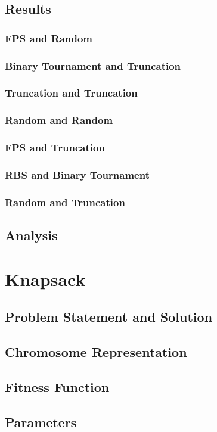 \documentclass[11pt, letterpaper]{article}
\begin{document}
\subsection{Results} 
\subsubsection {FPS and Random}
\subsubsection {Binary Tournament and Truncation}
\subsubsection {Truncation and Truncation}
\subsubsection {Random and Random}
\subsubsection {FPS and Truncation}
\subsubsection {RBS and Binary Tournament}
\subsubsection {Random and Truncation}
\subsection{Analysis}

\section{Knapsack}
\subsection{Problem Statement and Solution}
\subsection{Chromosome Representation}
\subsection{Fitness Function}
\subsection{Parameters}
\end{document}
